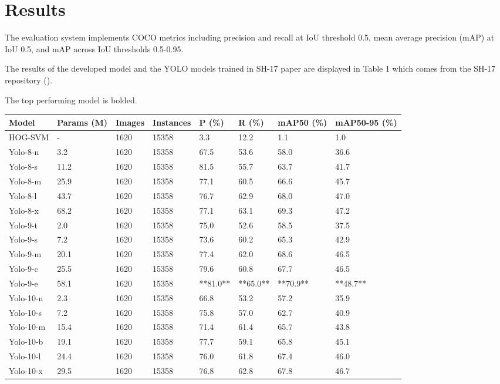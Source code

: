 \section{Results}

The evaluation system implements COCO metrics including precision and recall at IoU threshold 0.5, mean average precision (mAP) at IoU 0.5, and mAP across IoU thresholds 0.5-0.95.

The results of the developed model and the YOLO models trained in SH-17 paper are displayed in Table 1 which comes from the SH-17 repository ().

The top performing model is bolded.

\begin{table}[!ht]
    \centering
    \begin{tabular}{|l|l|l|l|l|l|l|l|}
    \hline
        Model & Params (M) & Images & Instances & P (\%) & R (\%) & mAP50 (\%) & mAP50-95 (\%) \\ \hline
        HOG-SVM & - & 1620 & 15358 & 3.3 & 12.2 & 1.1 & 1.0 \\ \hline
        Yolo-8-n & 3.2 & 1620 & 15358 & 67.5 & 53.6 & 58.0 & 36.6 \\ \hline
        Yolo-8-s & 11.2 & 1620 & 15358 & 81.5 & 55.7 & 63.7 & 41.7 \\ \hline
        Yolo-8-m & 25.9 & 1620 & 15358 & 77.1 & 60.5 & 66.6 & 45.7 \\ \hline
        Yolo-8-l & 43.7 & 1620 & 15358 & 76.7 & 62.9 & 68.0 & 47.0 \\ \hline
        Yolo-8-x & 68.2 & 1620 & 15358 & 77.1 & 63.1 & 69.3 & 47.2 \\ \hline
        Yolo-9-t & 2.0 & 1620 & 15358 & 75.0 & 52.6 & 58.5 & 37.5 \\ \hline
        Yolo-9-s & 7.2 & 1620 & 15358 & 73.6 & 60.2 & 65.3 & 42.9 \\ \hline
        Yolo-9-m & 20.1 & 1620 & 15358 & 77.4 & 62.0 & 68.6 & 46.5 \\ \hline
        Yolo-9-c & 25.5 & 1620 & 15358 & 79.6 & 60.8 & 67.7 & 46.5 \\ \hline
        Yolo-9-e & 58.1 & 1620 & 15358 & **81.0** & **65.0** & **70.9** & **48.7** \\ \hline
        Yolo-10-n & 2.3 & 1620 & 15358 & 66.8 & 53.2 & 57.2 & 35.9 \\ \hline
        Yolo-10-s & 7.2 & 1620 & 15358 & 75.8 & 57.0 & 62.7 & 40.9 \\ \hline
        Yolo-10-m & 15.4 & 1620 & 15358 & 71.4 & 61.4 & 65.7 & 43.8 \\ \hline
        Yolo-10-b & 19.1 & 1620 & 15358 & 77.7 & 59.1 & 65.8 & 45.1 \\ \hline
        Yolo-10-l & 24.4 & 1620 & 15358 & 76.0 & 61.8 & 67.4 & 46.0 \\ \hline
        Yolo-10-x & 29.5 & 1620 & 15358 & 76.8 & 62.8 & 67.8 & 46.7 \\ \hline
    \end{tabular}
\end{table}

